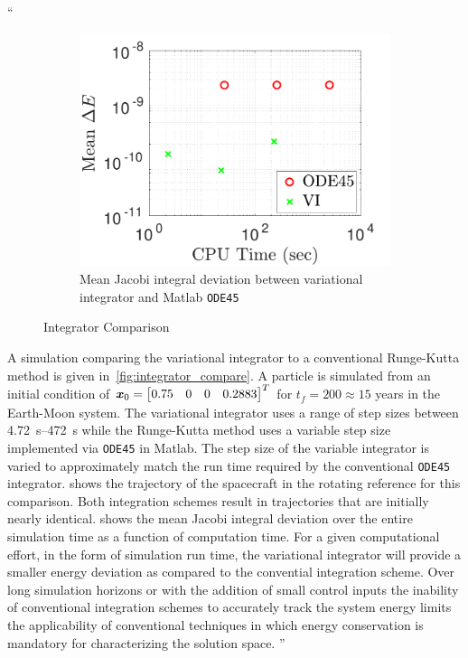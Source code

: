 \documentclass[11pt]{article}
\newenvironment{correction}{\begin{list}{}{\setlength{\leftmargin}{1cm}\setlength{\rightmargin}{1cm}}\vspace{\parsep}\item[]``}{''\end{list}}
\begin{document}
\begin{enumerate}
\begin{correction}
\begin{figure}
\begin{subfigure}[htbp]{0.5\textwidth}
                \includegraphics[width=\textwidth]{figures/cputimevsE.pdf} 
                \caption{Mean Jacobi integral deviation between variational integrator and Matlab \texttt{ODE45}} 
        \end{subfigure} 
        \caption{Integrator Comparison}
\end{figure}
A simulation comparing the variational integrator to a conventional Runge-Kutta method is given in~\cref{fig:integrator_compare}.
A particle is simulated from an initial condition of \( \bm{x}_0 = \begin{bmatrix} 0.75 & 0 & 0 & 0.2883\end{bmatrix}^T \) for \( t_f = 200 \approx 15\) years in the Earth-Moon system.
    The variational integrator uses a range of step sizes between \SIrange{4.72}{472}{\second} while the Runge-Kutta method uses a variable step size implemented via \texttt{ODE45} in Matlab.
    The step size of the variable integrator is varied to approximately match the run time required by the conventional \texttt{ODE45} integrator.
 shows the trajectory of the spacecraft in the rotating reference for this comparison.
Both integration schemes result in trajectories that are initially nearly identical.
 shows the mean Jacobi integral deviation over the entire simulation time as a function of computation time.
For a given computational effort, in the form of simulation run time, the variational integrator will provide a smaller energy deviation as compared to the convential integration scheme.
Over long simulation horizons or with the addition of small control inputs the inability of conventional integration schemes to accurately track the system energy limits the applicability of conventional techniques in which energy conservation is mandatory for characterizing the solution space.
\end{correction}


\end{enumerate}
\end{document}
